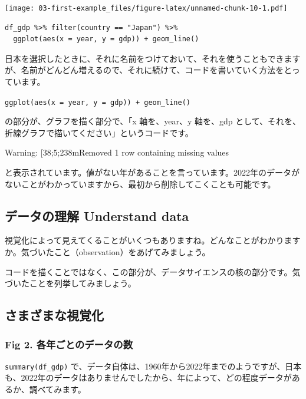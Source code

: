 \documentclass[
  xelatex, ja=standard]{bxjsbook}
\theoremstyle{definition}
\theoremstyle{definition}
\theoremstyle{definition}
\theoremstyle{definition}
\theoremstyle{remark}
\begin{document}
\texttt{[image: 03-first-example\_files/figure-latex/unnamed-chunk-10-1.pdf]}

\begin{verbatim}
df_gdp %>% filter(country == "Japan") %>%
  ggplot(aes(x = year, y = gdp)) + geom_line()
\end{verbatim}

日本を選択したときに、それに名前をつけておいて、それを使うこともできますが、名前がどんどん増えるので、それに続けて、コードを書いていく方法をとっています。

\texttt{ggplot(aes(x\ =\ year,\ y\ =\ gdp))\ +\ geom\_line()}

の部分が、グラフを描く部分で、「x 軸を、year、y 軸を、gdp として、それを、折線グラフで描いてください」というコードです。

Warning: {[}38;5;238mRemoved 1 row containing missing values

と表示されています。値がない年があることを言っています。2022年のデータがないことがわかっていますから、最初から削除してこくことも可能です。

\hypertarget{ux30c7ux30fcux30bfux306eux7406ux89e3-understand-data}{%
\subsection{データの理解 Understand data}\label{ux30c7ux30fcux30bfux306eux7406ux89e3-understand-data}}

視覚化によって見えてくることがいくつもありますね。どんなことがわかりますか。気づいたこと（observation）をあげてみましょう。

コードを描くことではなく、この部分が、データサイエンスの核の部分です。気づいたことを列挙してみましょう。

\hypertarget{ux3055ux307eux3056ux307eux306aux8996ux899aux5316}{%
\subsection{さまざまな視覚化}\label{ux3055ux307eux3056ux307eux306aux8996ux899aux5316}}

\hypertarget{fig-2.-ux5404ux5e74ux3054ux3068ux306eux30c7ux30fcux30bfux306eux6570}{%
\subsubsection{Fig 2. 各年ごとのデータの数}\label{fig-2.-ux5404ux5e74ux3054ux3068ux306eux30c7ux30fcux30bfux306eux6570}}

\texttt{summary(df\_gdp)} で、データ自体は、1960年から2022年までのようですが、日本も、2022年のデータはありませんでしたから、年によって、どの程度データがあるか、調べてみます。
\end{document}
